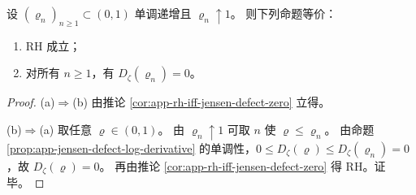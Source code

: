 \begin{theorem}[任意趋近列的可数化判据]\label{thm:app-jensen-countable-criterion}
设 \((\varrho_n)_{n\ge 1}\subset(0,1)\) 单调递增且 \(\varrho_n\uparrow 1\)。
则下列命题等价：
\begin{enumerate}
  \item[(a)] RH 成立；
  \item[(b)] 对所有 \(n\ge 1\)，有 \(D_{\zeta}(\varrho_n)=0\)。
\end{enumerate}
\end{theorem}
\begin{proof}
(a)\(\Rightarrow\)(b) 由推论 \ref{cor:app-rh-iff-jensen-defect-zero} 立得。
\par
(b)\(\Rightarrow\)(a) 取任意 \(\varrho\in(0,1)\)。
由 \(\varrho_n\uparrow 1\) 可取 \(n\) 使 \(\varrho\le \varrho_n\)。
由命题 \ref{prop:app-jensen-defect-log-derivative} 的单调性，\(0\le D_{\zeta}(\varrho)\le D_{\zeta}(\varrho_n)=0\)，故 \(D_{\zeta}(\varrho)=0\)。
再由推论 \ref{cor:app-rh-iff-jensen-defect-zero} 得 RH。证毕。
\end{proof}

